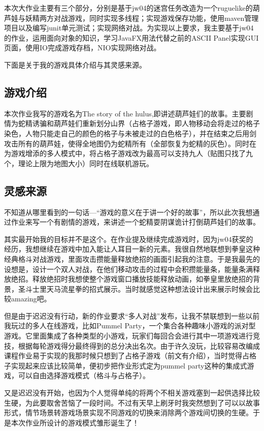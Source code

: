 \documentclass{SCIS2022cn}
\begin{document}
本次大作业主要有三个部分，分别是基于jw04的迷宫任务改造为一个ruguelike的葫芦娃与妖精两方对战游戏，同时实现多线程；实现游戏保存功能，使用maven管理项目以及编写junit单元测试；实现网络对战。为实现以上要求，我主要基于jw04的作业，运用面向对象的知识，学习JavaFX用法代替之前的ASCII Panel实现GUI页面，使用IO完成游戏存档，NIO实现网络对战。

下面是关于我的游戏具体介绍与其灵感来源。


\subsection{游戏介绍}

本次作业我写的游戏名为The story of the hulus,即讲述葫芦娃们的故事。主要剧情为蛇精诱骗和葫芦娃们重新划分山界（占格子游戏，即人物移动会将走过的格子染色，人物只能走自己的颜色的格子与未被走过的白色格子），并在结束之后用剑攻击所有的葫芦娃，使得全地图仍为蛇精所有（全部恢复为蛇精的灰色）。同时在为游戏增添的多人模式中，将占格子游戏改为最高可以支持九人（贴图只找了九个，理论上限为地图大小）同时在线联机游玩。


\subsection{灵感来源}

不知道从哪里看到的一句话—“游戏的意义在于讲一个好的故事”，所以此次我想通过作业来写一个有剧情的游戏，来讲述一个蛇精耍阴谋诡计打倒葫芦娃们的故事。

其实最开始我的目标并不是这个。在作业提及继续完成游戏时，因为jw04获奖的经历，我想继续在游戏中加入能让人耳目一新的元素。我很自然地联想到拳皇这种经典格斗对战游戏，里面攻击攒能量释放绝招的画面引起我的注意。于是我最先的设想是，设计一个双人对战，在他们移动攻击的过程中会积攒能量条，能量条满释放绝招。释放绝招时我想使整个游戏窗口播放技能释放动画，如拳皇里放绝招的背景，圣斗士里天马流星拳的招式展示。当时就感觉这种想法设计出来展示时候会比较amazing吧。

但是由于迟迟没有行动，新的作业要求“多人对战”发布，让我不禁联想到一些以前我玩过的多人在线游戏，比如Pummel Party，一个集合各种趣味小游戏的派对型游戏。它里面集成了各种类型的小游戏，玩家们每回合会进行其中一项游戏进行竞技，根据每轮游戏得分最终得到的总分决出名次。由于许久没玩，比较容易改编成课程作业易于实现的我那时候只想到了占格子游戏（前文有介绍），当时觉得占格子实现起来应该比较简单，便初步把作业形式定为pummel party这种的集成式游戏，可以自由选择游戏模式（格斗与占格子）。

又是迟迟没有开始，也因为个人觉得单纯的将两个不相关游戏塞到一起供选择比较生硬，为此要取舍苦恼了一段时间。不过有天早上刷牙时我突然想到了可以以故事形式，情节场景转游戏场景实现不同游戏的切换来消除两个游戏间切换的生硬。于是本次作业所设计的游戏模式雏形诞生了！
\end{document}
